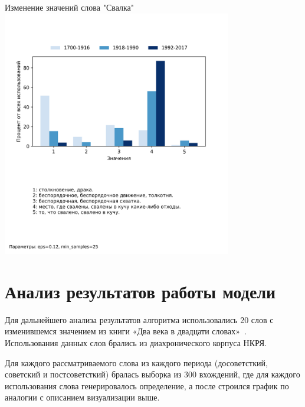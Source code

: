 \documentclass[LI,VKR]{HSEUniversity}
\begin{document}
\begin{FIGURE}[H]{Изменение значений слова "Свалка" \label{fig:example-figure-2}}
	\includegraphics[width=0.75\textwidth]{img/visualizations/svalka}
\end{FIGURE}

%

\chapter{Анализ результатов работы модели}

Для дальнейшего анализа результатов алгоритма использовались 20 слов с изменившемся
значением из книги «Два века в двадцати словах»~\cite{TwoCenturies}.
Использования данных слов брались из диахронического корпуса НКРЯ.

Для каждого рассматриваемого слова из каждого периода (досоветсткий, советский и постсоветсткий)
бралась выборка из 300 вхождений,
где для каждого использования слова генерировалось определение, а после строился график по аналогии с
описанием визуализации выше.
\end{document}
